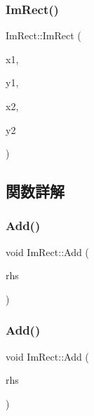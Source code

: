\mbox{\label{struct_im_rect_a4cd168f1ae088e15db64b95b880f8933}} 
\subsubsection{\texorpdfstring{Im\+Rect()}{ImRect()}\hspace{0.1cm}{\footnotesize\ttfamily [4/4]}}
{\footnotesize\ttfamily Im\+Rect\+::\+Im\+Rect (\begin{DoxyParamCaption}\item[{float}]{x1,  }\item[{float}]{y1,  }\item[{float}]{x2,  }\item[{float}]{y2 }\end{DoxyParamCaption})\hspace{0.3cm}{\ttfamily [inline]}}



\subsection{関数詳解}
\mbox{\label{struct_im_rect_a9d6cbef8c86ca01a16bb0fd35b457f88}} 
\subsubsection{\texorpdfstring{Add()}{Add()}\hspace{0.1cm}{\footnotesize\ttfamily [1/2]}}
{\footnotesize\ttfamily void Im\+Rect\+::\+Add (\begin{DoxyParamCaption}\item[{const \mbox{\hyperlink{struct_im_vec2}{Im\+Vec2}} \&}]{rhs }\end{DoxyParamCaption})\hspace{0.3cm}{\ttfamily [inline]}}

\mbox{\label{struct_im_rect_a9bcb65fd17843c74555291a522e9ebdf}} 
\subsubsection{\texorpdfstring{Add()}{Add()}\hspace{0.1cm}{\footnotesize\ttfamily [2/2]}}
{\footnotesize\ttfamily void Im\+Rect\+::\+Add (\begin{DoxyParamCaption}\item[{const \mbox{\hyperlink{struct_im_rect}{Im\+Rect}} \&}]{rhs }\end{DoxyParamCaption})\hspace{0.3cm}{\ttfamily [inline]}}

